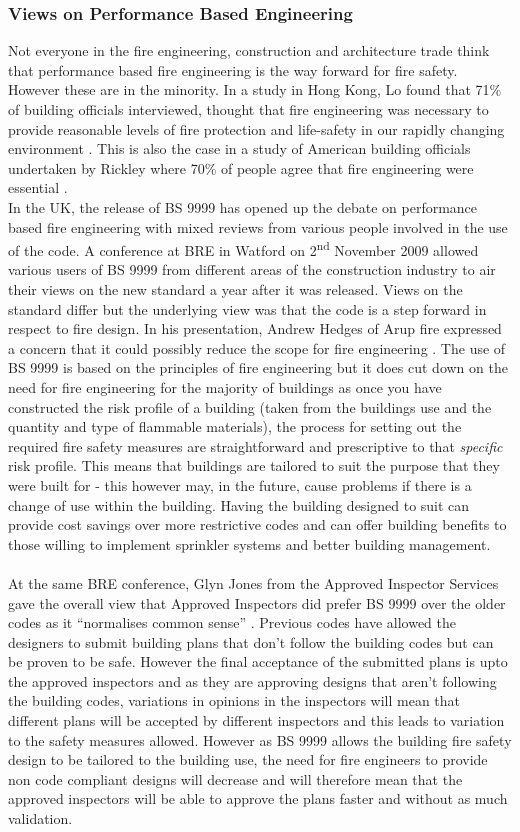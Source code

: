 \documentclass[table,a4paper,oneside]{book}
\begin{document}
\subsubsection{Views on Performance Based Engineering}
Not everyone in the fire engineering, construction and architecture trade think that performance based fire engineering is the way forward for fire safety. However these are in the minority. In a study in Hong Kong, Lo found that 71\% of building officials interviewed, thought that fire engineering was necessary to provide reasonable levels of fire protection and life-safety in our rapidly changing environment \citep{Lo2002}. This is also the case in a study of American building officials undertaken by Rickley where 70\% of people agree that fire engineering were essential \citep{Rickley1996}.
\\
In the UK, the release of BS 9999 has opened up the debate on performance based fire engineering with mixed reviews from various people involved in the use of the code. A conference at BRE in Watford on 2\textsuperscript{nd} November 2009 allowed various users of BS 9999 from different areas of the construction industry to air their views on the new standard a year after it was released.
Views on the standard differ but the underlying view was that the code is a step forward in respect to fire design. In his presentation, Andrew Hedges of Arup fire expressed a concern that it could possibly reduce the scope for fire engineering \citep{Hedges2009}. The use of BS 9999 is based on the principles of fire engineering but it does cut down on the need for fire engineering for the majority of buildings as once you have constructed the risk profile of a building (taken from the buildings use and the quantity and type of flammable materials), the process for setting out the required fire safety measures are straightforward and prescriptive to that \emph{specific} risk profile. This means that buildings are tailored to suit the purpose that they were built for - this however may, in the future, cause problems if there is a change of use within the building. Having the building designed to suit can provide cost savings over more restrictive codes and can offer building benefits to those willing to implement sprinkler systems and better building management.
\\
\\
At the same BRE conference, Glyn Jones from the Approved Inspector Services gave the overall view that Approved Inspectors did prefer BS 9999 over the older codes as it ``normalises common sense'' \citep{Jones2009}. Previous codes have allowed the designers to submit building plans that don't follow the building codes but can be proven to be safe. However the final acceptance of the submitted plans is upto the approved inspectors and as they are approving designs that aren't following the building codes, variations in opinions in the inspectors will mean that different plans will be accepted by different inspectors and this leads to variation to the safety measures allowed. However as BS 9999 allows the building fire safety design to be tailored to the building use, the need for fire engineers to provide non code compliant designs will decrease and will therefore mean that the approved inspectors will be able to approve the plans faster and without as much validation.
\end{document}
